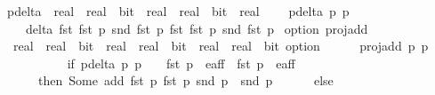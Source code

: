 \begin{isabellebody}
\isanewline
{}\isamarkupfalse%
\ p{\isacharunderscore}delta{\isacharprime}\ {\isacharcolon}{\isacharcolon}\ {\isachardoublequoteopen}{\isacharparenleft}real\ {\isasymtimes}\ real{\isacharparenright}\ {\isasymtimes}\ bit\ {\isasymRightarrow}\ {\isacharparenleft}real\ {\isasymtimes}\ real{\isacharparenright}\ {\isasymtimes}\ bit\ {\isasymRightarrow}\ real{\isachardoublequoteclose}\ \ \isanewline
\ \ {\isachardoublequoteopen}p{\isacharunderscore}delta{\isacharprime}\ p{}\ p{}\ {\isacharequal}\ \isanewline
\ \ \ \ delta{\isacharprime}\ {\isacharparenleft}fst\ {\isacharparenleft}fst\ p{}{\isacharparenright}{\isacharparenright}\ {\isacharparenleft}snd\ {\isacharparenleft}fst\ p{}{\isacharparenright}{\isacharparenright}\ {\isacharparenleft}fst\ {\isacharparenleft}fst\ p{}{\isacharparenright}{\isacharparenright}\ {\isacharparenleft}snd\ {\isacharparenleft}fst\ p{}{\isacharparenright}{\isacharparenright}{\isachardoublequoteclose}\isanewline
\isanewline
{}\isamarkupfalse%
\ {\isacharparenleft}option{\isacharparenright}\ proj{\isacharunderscore}add\ {\isacharcolon}{\isacharcolon}\ \isanewline
\ \ {\isachardoublequoteopen}{\isacharparenleft}real\ {\isasymtimes}\ real{\isacharparenright}\ {\isasymtimes}\ bit\ {\isasymRightarrow}\ {\isacharparenleft}real\ {\isasymtimes}\ real{\isacharparenright}\ {\isasymtimes}\ bit\ {\isasymRightarrow}\ {\isacharparenleft}{\isacharparenleft}real\ {\isasymtimes}\ real{\isacharparenright}\ {\isasymtimes}\ bit{\isacharparenright}\ option{\isachardoublequoteclose}\ \isanewline
\ \ {\isachardoublequoteopen}\isanewline
\ \ proj{\isacharunderscore}add\ p{}\ p{}\ {\isacharequal}\ \ \isanewline
\ \ \ \ {\isacharparenleft}\isanewline
\ \ \ \ \ \ if\ {\isacharparenleft}p{\isacharunderscore}delta\ p{}\ p{}\ {\isasymnoteq}\ {}\ {\isasymand}\ fst\ p{}\ {\isasymin}\ e{\isacharunderscore}aff\ {\isasymand}\ fst\ p{}\ {\isasymin}\ e{\isacharunderscore}aff{\isacharparenright}\ \isanewline
\ \ \ \ \ \ then\ Some\ {\isacharparenleft}add\ {\isacharparenleft}fst\ p{}{\isacharparenright}\ {\isacharparenleft}fst\ p{}{\isacharparenright}{\isacharcomma}\ {\isacharparenleft}snd\ p{}{\isacharparenright}\ {\isacharplus}\ {\isacharparenleft}snd\ p{}{\isacharparenright}{\isacharparenright}\isanewline
\ \ \ \ \ \ else\ \isanewline
\ \ \ \ \ \ \ \ {\isacharparenleft}\isanewline

\end{isabellebody}
